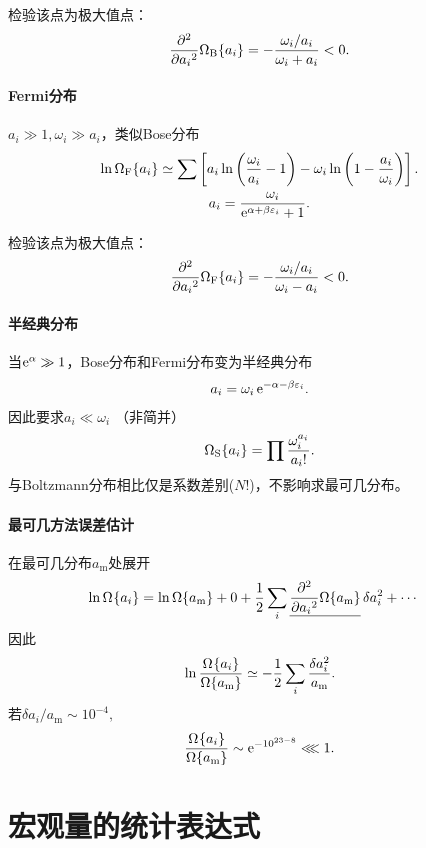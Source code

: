 检验该点为极大值点：
\[
	\pp[2]{a_i}\Om[B]=-\frac{\omega_i/a_i}{\omega_i+a_i}<0.
\]
\paragraph{Fermi分布}
$a_i\gg 1,\omega_i\gg a_i$，类似Bose分布
\begin{gather}\notag
	\ln\Om[F]\simeq\sum\fkh{a_i\ln\kh{\frac{\omega_i}{a_i}-1}-\omega_i\ln\kh{1-\frac{a_i}{\omega_i}}}.\\
	a_i=\frac{\omega_i}{\e{\alpha+\beta\varepsilon_i}+1}.
\end{gather}


检验该点为极大值点：
\[
	\pp[2]{a_i}\Om[F]=-\frac{\omega_i/a_i}{\omega_i-a_i}<0.
\]
\paragraph{半经典分布}
当$\e\alpha\gg 1$，Bose分布和Fermi分布变为半经典分布
\begin{align}
	a_i=\omega_i\e{-\alpha-\beta\varepsilon_i}.
\end{align}
因此要求$a_i\ll\omega_i$ （非简并）
\begin{align}
	\Om[S]=\prod\frac{\omega_i^{a_i}}{a_i!}.
\end{align}
与Boltzmann分布相比仅是系数差别($N!$)，不影响求最可几分布。
\paragraph{最可几方法误差估计}
在最可几分布$a_\mathrm m$处展开
\begin{align*}
	\ln\Om & =\ln\Omm+0+\frac12\sum_i\underline{\pp[2]{a_i}\Omm}\,\delta a_i^2+\cdots
\end{align*}
因此
\[
	\ln\frac\Om\Omm\simeq-\frac12\sum_i\frac{\delta a_i^2}{a_\mathrm m}.
\]
若$\delta a_i/a_\mathrm m\sim 10^{-4},$
\[
	\frac\Om\Omm\sim\e{-10^{23-8}}\lll 1.
\]

\section{宏观量的统计表达式}

